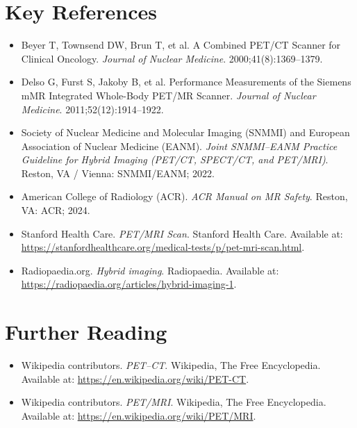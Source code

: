 \section{Key References}
\begin{itemize}
    \item Beyer T, Townsend DW, Brun T, et al. A Combined PET/CT Scanner for Clinical Oncology. \textit{Journal of Nuclear Medicine}. 2000;41(8):1369--1379.
    \item Delso G, Furst S, Jakoby B, et al. Performance Measurements of the Siemens mMR Integrated Whole-Body PET/MR Scanner. \textit{Journal of Nuclear Medicine}. 2011;52(12):1914--1922.
    \item Society of Nuclear Medicine and Molecular Imaging (SNMMI) and European Association of Nuclear Medicine (EANM). \textit{Joint SNMMI--EANM Practice Guideline for Hybrid Imaging (PET/CT, SPECT/CT, and PET/MRI)}. Reston, VA / Vienna: SNMMI/EANM; 2022.
    \item American College of Radiology (ACR). \textit{ACR Manual on MR Safety}. Reston, VA: ACR; 2024.
    \item Stanford Health Care. \textit{PET/MRI Scan}. Stanford Health Care. Available at: \url{https://stanfordhealthcare.org/medical-tests/p/pet-mri-scan.html}.
    \item Radiopaedia.org. \textit{Hybrid imaging}. Radiopaedia. Available at: \url{https://radiopaedia.org/articles/hybrid-imaging-1}.
\end{itemize}

\section{Further Reading}
\begin{itemize}
  \item Wikipedia contributors. \textit{PET--CT}. Wikipedia, The Free Encyclopedia. Available at: \url{https://en.wikipedia.org/wiki/PET-CT}.
  \item Wikipedia contributors. \textit{PET/MRI}. Wikipedia, The Free Encyclopedia. Available at: \url{https://en.wikipedia.org/wiki/PET/MRI}.
\end{itemize}
